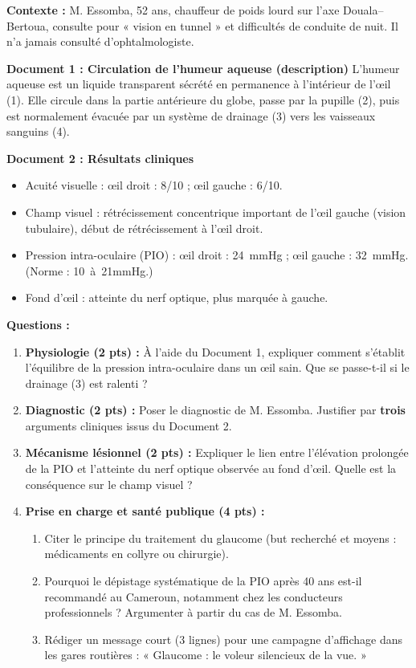 \documentclass[11pt]{article}
\begin{document}
\begin{exercice}
\textbf{Contexte :} M. Essomba, 52 ans, chauffeur de poids lourd sur l'axe Douala--Bertoua, consulte pour « vision en tunnel » et difficultés de conduite de nuit. Il n'a jamais consulté d'ophtalmologiste.

\textbf{Document 1 : Circulation de l'humeur aqueuse (description)}
L'humeur aqueuse est un liquide transparent sécrété en permanence à l'intérieur de l'œil (1). Elle circule dans la partie antérieure du globe, passe par la pupille (2), puis est normalement évacuée par un système de drainage (3) vers les vaisseaux sanguins (4).

\textbf{Document 2 : Résultats cliniques}
\begin{itemize}
\item Acuité visuelle : œil droit : 8/10 ; œil gauche : 6/10.
\item Champ visuel : rétrécissement concentrique important de l'œil gauche (vision tubulaire), début de rétrécissement à l'œil droit.
\item Pression intra-oculaire (PIO) : œil droit : \SI{24}{mmHg} ; œil gauche : \SI{32}{mmHg}. (Norme : \SI{10}{à 21}{mmHg}.)
\item Fond d'œil : atteinte du nerf optique, plus marquée à gauche.
\end{itemize}

\textbf{Questions :}
\begin{enumerate}
\item \textbf{Physiologie (2 pts) :} À l'aide du Document 1, expliquer comment s'établit l'équilibre de la pression intra-oculaire dans un œil sain. Que se passe-t-il si le drainage (3) est ralenti ?
\item \textbf{Diagnostic (2 pts) :} Poser le diagnostic de M. Essomba. Justifier par \textbf{trois} arguments cliniques issus du Document 2.
\item \textbf{Mécanisme lésionnel (2 pts) :} Expliquer le lien entre l'élévation prolongée de la PIO et l'atteinte du nerf optique observée au fond d'œil. Quelle est la conséquence sur le champ visuel ?
\item \textbf{Prise en charge et santé publique (4 pts) :}
\begin{enumerate}
\item Citer le principe du traitement du glaucome (but recherché et moyens : médicaments en collyre ou chirurgie).
\item Pourquoi le dépistage systématique de la PIO après 40 ans est-il recommandé au Cameroun, notamment chez les conducteurs professionnels ? Argumenter à partir du cas de M. Essomba.
\item Rédiger un message court (3 lignes) pour une campagne d'affichage dans les gares routières : « Glaucome : le voleur silencieux de la vue. »
\end{enumerate}
\end{enumerate}
\end{exercice}
\end{document}
